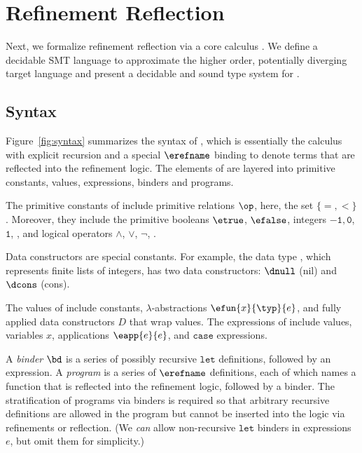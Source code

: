 \section{Refinement Reflection}
\label{sec:formalism}
\label{sec:types-reflection}
\label{sec:theory}

Next, we formalize refinement reflection
via a core calculus \corelan.
%
We define a decidable SMT language \smtlan to approximate the
higher order, potentially diverging
target language \corelan
and present a decidable and sound type system
for \corelan.

\subsection{Syntax}

%
Figure~\ref{fig:syntax} summarizes the syntax of \corelan,
which is essentially the calculus \undeclang~\cite{Vazou14}
with explicit recursion and a special $\erefname$ binding
to denote terms that are reflected into the refinement logic.
%
The elements of \corelan are layered into
primitive constants, values, expressions, binders
and programs.

The primitive constants of \corelan
include primitive relations $\op$,
here, the set $\{ =, <\}$.
%
Moreover, they include the
primitive booleans $\etrue$, $\efalse$,
integers $\mathtt{-1}, \mathtt{0}$, $\mathtt{1}$, \etc,
and logical operators $\mathtt{\land}$, $\mathtt{\lor}$, $\mathtt{\lnot}$, \etc.

%
Data constructors are special constants.
For example, the data type \tintlist, which represents
finite lists of integers, has two data constructors: $\dnull$ (nil)
and $\dcons$ (cons).

%
The values of \corelan include
constants, $\lambda$-abstractions
$\efun{x}{\typ}{e}$, and fully
applied data constructors $D$
that wrap values.
%
The expressions of \corelan
include values, variables $x$,
applications $\eapp{e}{e}$, and
$\mathtt{case}$ expressions.

%
A \emph{binder} $\bd$ is a series of possibly recursive
$\mathtt{let}$ definitions, followed by an expression.
%
A \emph{program} \prog is a series of $\erefname$
definitions, each of which names a function
that is reflected into the refinement
logic, followed by a binder.
%
The stratification of programs via binders
is required so that arbitrary recursive definitions
are allowed in the program but cannot be inserted into the logic
via refinements or reflection.
%
(We \emph{can} allow non-recursive $\mathtt{let}$
binders in expressions $e$, but omit them for simplicity.)

